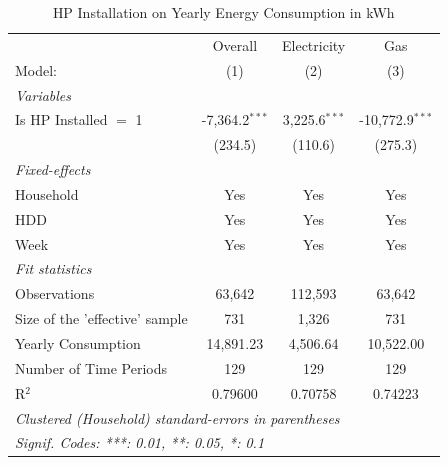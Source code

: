 
\begin{table}[htbp]
   \caption{\label{tab:hp-did-twfe} HP Installation on Yearly Energy Consumption in kWh}
   \centering
   \begin{tabular}{lccc}
      \tabularnewline \midrule \midrule
                                     & Overall          & Electricity     & Gas \\   
      Model:                         & (1)              & (2)             & (3)\\  
      \midrule
      \emph{Variables}\\
      Is HP Installed $=$ 1          & -7,364.2$^{***}$ & 3,225.6$^{***}$ & -10,772.9$^{***}$\\   
                                     & (234.5)          & (110.6)         & (275.3)\\   
      \midrule
      \emph{Fixed-effects}\\
      Household                      & Yes              & Yes             & Yes\\  
      HDD                            & Yes              & Yes             & Yes\\  
      Week                           & Yes              & Yes             & Yes\\  
      \midrule
      \emph{Fit statistics}\\
      Observations                   & 63,642           & 112,593         & 63,642\\  
      Size of the 'effective' sample & 731              & 1,326           & 731\\  
      Yearly Consumption             & 14,891.23        & 4,506.64        & 10,522.00\\  
      Number of Time Periods         & 129              & 129             & 129\\  
      R$^2$                          & 0.79600          & 0.70758         & 0.74223\\  
      \midrule \midrule
      \multicolumn{4}{l}{\emph{Clustered (Household) standard-errors in parentheses}}\\
      \multicolumn{4}{l}{\emph{Signif. Codes: ***: 0.01, **: 0.05, *: 0.1}}\\
   \end{tabular}
\end{table}



